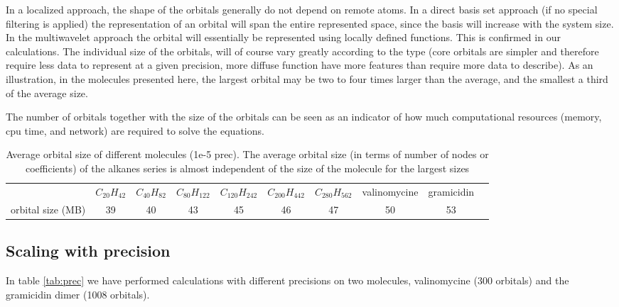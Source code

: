 \documentclass{article}
\begin{document}
In a localized approach, the shape of the orbitals generally do not depend on remote atoms. In a direct basis set approach (if no special filtering is applied) the representation of an orbital will span the entire represented space, since the basis will increase with the system size. In the multiwavelet approach the orbital will essentially be represented using locally defined functions.
This is confirmed in our calculations.
The individual size of the orbitals, will of course vary greatly according to the type (core orbitals are simpler and therefore require less data to represent at a given precision, more diffuse function have more features than require more data to describe). As an illustration, in the molecules presented here, the largest orbital may be two to four times larger than the average, and the smallest a third of the average size.

The number of orbitals together with the size of the orbitals can be seen as an indicator of how much computational resources (memory, cpu time, and network) are required to solve the equations. 

\begin{table}[t]
    \centering
    \begin{tabular}{cccccccccc}
& $C_{20}H_{42}$& $C_{40}H_{82}$& $C_{80}H_{122}$& $C_{120}H_{242}$&  $C_{200}H_{442}$ & $C_{280}H_{562}$ &valinomycine & gramicidin\\
orbital size (MB)  &  39 &  40   & 43  &  45  & 46 & 47 & 50 & 53\\
    \end{tabular}
    \caption{Average orbital size of different molecules (1e-5 prec). The average orbital size (in terms of number of nodes or coefficients) of the alkanes series is almost independent of the size of the molecule for the largest sizes}
    \label{tab:orbsizes}
\end{table}



\subsection{Scaling with precision}

In table \ref{tab:prec} we have performed calculations with different precisions on two molecules, valinomycine (300 orbitals) and the gramicidin dimer (1008 orbitals).
\end{document}
